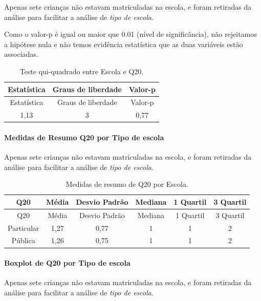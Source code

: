 \documentclass[]{article}
\let\oldparagraph\paragraph
\renewcommand{\paragraph}[1]{\oldparagraph{#1}\mbox{}}
\begin{document}
Apenas sete crianças não estavam matriculadas na escola, e foram retiradas da análise para facilitar a análise de \emph{tipo de escola}.

Como o valor-p é igual ou maior que 0.01 (nível de significância), não rejeitamos a hipótese nula e não temos evidência estatística que as duas variáveis estão associadas.

\begin{longtable}[]{@{}ccc@{}}
\caption{\label{tab:unnamed-chunk-409}Teste qui-quadrado entre Escola e Q20.}\tabularnewline
\toprule
Estatística & Graus de liberdade & Valor-p\tabularnewline
\midrule
\endfirsthead
\toprule
Estatística & Graus de liberdade & Valor-p\tabularnewline
\midrule
\endhead
1,13 & 3 & 0,77\tabularnewline
\bottomrule
\end{longtable}

\cleardoublepage

\hypertarget{medidas-de-resumo-q20-por-tipo-de-escola}{%
\paragraph{Medidas de Resumo Q20 por Tipo de escola}\label{medidas-de-resumo-q20-por-tipo-de-escola}}

Apenas sete crianças não estavam matriculadas na escola, e foram retiradas da análise para facilitar a análise de \emph{tipo de escola}.

\begin{longtable}[]{@{}cccccc@{}}
\caption{\label{tab:unnamed-chunk-410}Medidas de resumo de Q20 por Escola.}\tabularnewline
\toprule
Q20 & Média & Desvio Padrão & Mediana & 1 Quartil & 3 Quartil\tabularnewline
\midrule
\endfirsthead
\toprule
Q20 & Média & Desvio Padrão & Mediana & 1 Quartil & 3 Quartil\tabularnewline
\midrule
\endhead
Particular & 1,27 & 0,77 & 1 & 1 & 2\tabularnewline
Pública & 1,26 & 0,75 & 1 & 1 & 2\tabularnewline
\bottomrule
\end{longtable}

\hypertarget{boxplot-de-q20-por-tipo-de-escola}{%
\paragraph{Boxplot de Q20 por Tipo de escola}\label{boxplot-de-q20-por-tipo-de-escola}}

Apenas sete crianças não estavam matriculadas na escola, e foram retiradas da análise para facilitar a análise de \emph{tipo de escola}.
\end{document}
